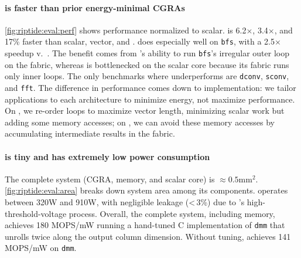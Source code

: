 \paragraph{\riptide is faster than prior energy-minimal CGRAs}
\autoref{fig:riptide:eval:perf} shows performance normalized to scalar.
%
\riptide is 6.2$\times$, 3.4$\times$, and 17\% faster than scalar, vector, and \snafu.
%
%
%
%
% 
\riptide does especially well on {\tt bfs}, with a 2.5$\times$ speedup v.\ \snafu. The benefit comes
from \riptide's ability to run {\tt bfs}'s irregular outer loop on the fabric, whereas
% 
\snafu is bottlenecked on the scalar core because its fabric runs only inner loops. %
% 
The only benchmarks where \riptide underperforms \snafu are {\tt dconv}, {\tt sconv}, and {\tt fft}.
% 
The difference in performance comes down to implementation: we tailor applications to each architecture to minimize energy, not maximize performance.
% 
On \snafu, we re-order loops to maximize vector length, minimizing scalar work but adding some memory accesses;
on \riptide, we can avoid these memory accesses by accumulating intermediate results in the fabric.

\figRipTideArea

\paragraph{\riptide is tiny and has extremely low power consumption}
\label{riptide:eval:power_area}
The complete \riptide system (CGRA, memory, and scalar core) is $\approx 0.5\text{mm}^2$.
\autoref{fig:riptide:eval:area} breaks down system area among its components.
\riptide operates between 320\textmu W and 910\textmu W,
with negligible leakage (<\,3\%) due to \riptide's high-threshold-voltage process.
% 
Overall, the complete system, including memory, achieves
180 MOPS/mW running a hand-tuned C implementation of {\tt dmm} that unrolls twice along the output column dimension.
% 
Without tuning, \riptide achieves 141 MOPS/mW on {\tt dmm}.

\tabRipTideEvalCompare

